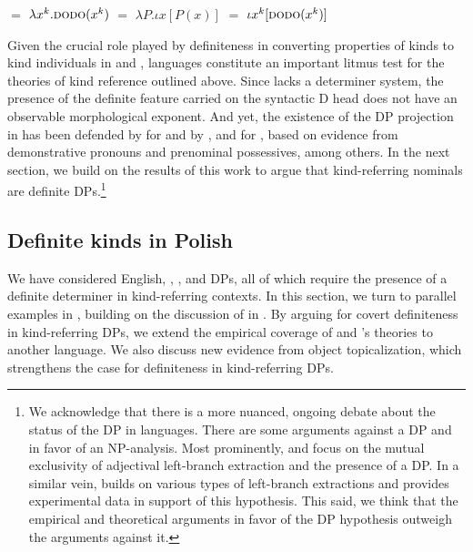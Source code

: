 \documentclass[output=paper]{langscibook}
\begin{document}
\ea \label{ex:deriv_borik}
\ea {} $=$ $\lambda x^k.\textsc{dodo}(x^k)$ \label{ex:deriv_borik_1}
\ex {} $=$ $\lambda P.\iota x[P(x)]$
\ex {} $=$ $\iota x^k[\textsc{dodo}(x^k)]$ \label{ex:deriv_borik_3}
\z \z

\noindent
Given the crucial role played by definiteness in converting properties of kinds to kind individuals in  and ,  languages constitute an important litmus test for the theories of kind reference outlined above. Since  lacks a determiner system, the presence of the definite feature carried on the syntactic D head does not have an observable morphological exponent. And yet, the existence of the DP projection in  has been defended by \citet{Pereltsvaig2007} for  and by \citet{Willim2000}, \citet{Migdalski2001} and \citet{Rutkowski2007} for , based on evidence from demonstrative pronouns and prenominal possessives, among others. In the next section, we build on the results of this work to argue that  kind-referring nominals are definite DPs.\footnote{\label{ftn:dp-hypothesis}We acknowledge that there is a more nuanced, ongoing debate about the status of the DP in  languages. There are some arguments against a DP and in favor of an NP-analysis. Most prominently, \citet{Boskovic2005} and \citet{Boskovic2007} focus on the mutual exclusivity of adjectival left-branch extraction and the presence of a DP. In a similar vein, \citet{Ceglowski2017} builds on various types of left-branch extractions and provides experimental data in support of this hypothesis. This said, we think that the empirical and theoretical arguments in favor of the DP hypothesis outweigh the arguments against it.}


\subsection{Definite kinds in Polish} \label{sec:def_kinds_pol}

We have considered English, , , and  DPs, all of which require the presence of a definite determiner in kind-referring contexts. In this section, we turn to parallel examples in , building on the discussion of  in \citet{Borik.Espinal2012, Borik.Espinal2016}. By arguing for covert definiteness in  kind-referring DPs, we extend the empirical coverage of  and \citeauthor{Borik.Espinal2012}'s theories to another language. We also discuss new evidence from object topicalization, which strengthens the case for definiteness in  kind-referring DPs.
\end{document}
